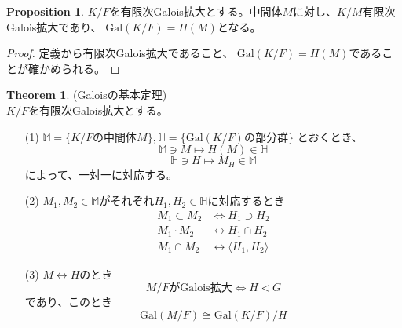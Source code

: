 \documentclass[dvipdfmx]{jsarticle}
\theoremstyle{definition}
\newtheorem{prop}[definition]{Proposition}
\newtheorem{theorem}[definition]{Theorem}
\begin{document}
\begin{prop}\label{tyuukanngal}
  $K/F$を有限次Galois拡大とする。中間体$M$に対し、$K/M$有限次Galois拡大であり、
  $\mathrm{Gal}(K/F)=H(M)$となる。
\end{prop}
\begin{proof}
  定義から有限次Galois拡大であること、
  $\mathrm{Gal}(K/F)=H(M)$であることが確かめられる。
\end{proof}
\begin{theorem}\label{gal} (Galoisの基本定理)\\
  $K/F$を有限次Galois拡大とする。
  \begin{enumerate}
    \item [(1)]
          $\mathbb{M}=\{K/F\mathrm{の中間体}M\},\mathbb{H}=\{\mathrm{Gal}(K/F)\mathrm{の部分群}\}$
          とおくとき、
          \[\mathbb{M}\ni M\longmapsto H(M)\in\mathbb{H}\]
          \[\mathbb{H}\ni H\longmapsto M_H\in\mathbb{M}\]
           によって、一対一に対応する。
    \item [(2)]
          $M_1,M_2\in\mathbb{M}$がそれぞれ$H_1,H_2\in\mathbb{H}$に対応するとき
          \begin{align*}
            M_1\subset M_2&\Longleftrightarrow H_1\supset H_2\\
            M_1\cdot M_2&\longleftrightarrow H_1\cap H_2\\
            M_1\cap M_2&\longleftrightarrow \langle H_1,H_2\rangle
          \end{align*}
    \item[(3)]
         $M\longleftrightarrow H$のとき
         \[M/F\mathrm{がGalois拡大}\Longleftrightarrow H\vartriangleleft G\]
         であり、このとき
         \[\mathrm{Gal}(M/F)\cong \mathrm{Gal}(K/F)/H\]
  \end{enumerate}
\end{theorem}
\end{document}
